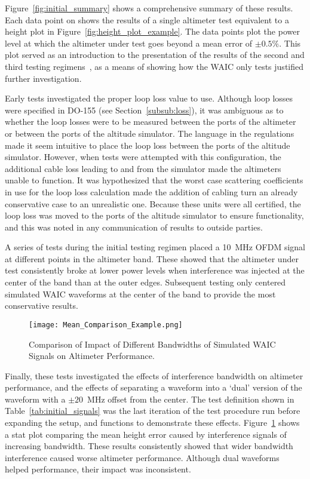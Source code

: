 Figure~\ref{fig:initial_summary} shows a comprehensive summary of these results. Each data point on shows the results of a single altimeter test equivalent to a height plot in Figure~\ref{fig:height_plot_example}. The data points plot the power level at which the altimeter under test goes beyond a mean error of $\pm0.5\%$. This plot served as an introduction to the presentation of the results of the second and third testing regimens~\cite{uwe_radio_2019}, as a means of showing how the WAIC only tests justified further investigation. 

Early tests investigated the proper loop loss value to use. Although loop losses were specified in DO-155 (see Section~\ref{subsub:loss}), it was ambiguous as to whether the loop losses were to be measured between the ports of the altimeter or between the ports of the altitude simulator. The language in the regulations made it seem intuitive to place the loop loss between the ports of the altitude simulator. However, when tests were attempted with this configuration, the additional cable loss leading to and from the simulator made the altimeters unable to function. It was hypothesized that the worst case scattering coefficients in use for the loop loss calculation made the addition of cabling turn an already conservative case to an unrealistic one. Because these units were all certified, the loop loss was moved to the ports of the altitude simulator to ensure functionality, and this was noted in any communication of results to outside parties.

A series of tests during the initial testing regimen placed a 10~MHz OFDM signal at different points in the altimeter band. These showed that the altimeter under test consistently broke at lower power levels when interference was injected at the center of the band than at the outer edges. Subsequent testing only centered simulated WAIC waveforms at the center of the band to provide the most conservative results. 
\begin{figure}[h!]
	\centering
	\texttt{[image: Mean\_Comparison\_Example.png]}
	\caption{Comparison of Impact of Different Bandwidths of Simulated WAIC Signals on Altimeter Performance.}
	\label{fig:mean_comparison}
\end{figure}
Finally, these tests investigated the effects of interference bandwidth on altimeter performance, and the effects of separating a waveform into a `dual' version of the waveform with a $\pm20$~MHz offset from the center. The test definition shown in Table~\ref{tab:initial_signals} was the last iteration of the test procedure run before expanding the setup, and functions to demonstrate these effects. Figure~\ref{fig:mean_comparison} shows a stat plot comparing the mean height error caused by interference signals of increasing bandwidth. These results consistently showed that wider bandwidth interference caused worse altimeter performance. Although dual waveforms helped performance, their impact was inconsistent.  

